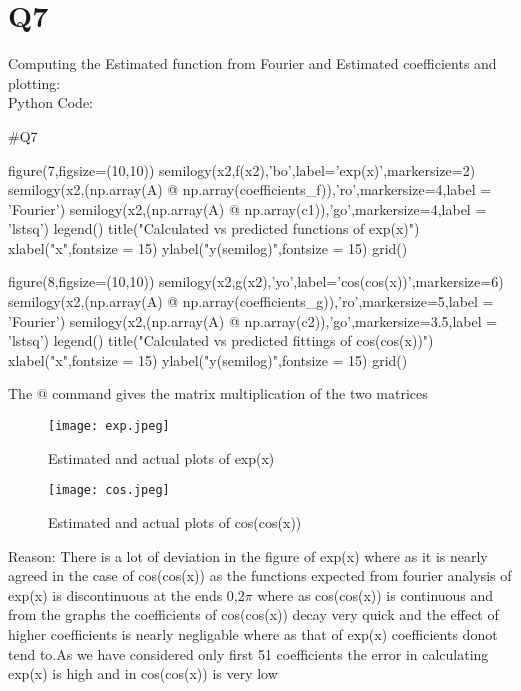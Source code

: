 \documentclass[12pt, a4paper]{report}
\begin{document}
\section*{Q7}
Computing the Estimated function from Fourier and Estimated coefficients and plotting: \\
Python Code:
\begin{py_code}
#Q7

figure(7,figsize=(10,10))
semilogy(x2,f(x2),'bo',label='exp(x)',markersize=2)
semilogy(x2,(np.array(A) @ np.array(coefficients_f)),'ro',markersize=4,label = 'Fourier')
semilogy(x2,(np.array(A) @ np.array(c1)),'go',markersize=4,label = 'lstsq')
legend()
title("Calculated vs predicted functions of exp(x)")
xlabel("x",fontsize = 15)
ylabel("y(semilog)",fontsize = 15)
grid()

figure(8,figsize=(10,10))
semilogy(x2,g(x2),'yo',label='cos(cos(x))',markersize=6)
semilogy(x2,(np.array(A) @ np.array(coefficients_g)),'ro',markersize=5,label = 'Fourier')
semilogy(x2,(np.array(A) @ np.array(c2)),'go',markersize=3.5,label = 'lstsq')
legend()
title("Calculated vs predicted fittings of cos(cos(x))")
xlabel("x",fontsize = 15)
ylabel("y(semilog)",fontsize = 15)
grid()
\end{py_code}
The @ command gives the matrix multiplication of the two matrices\\
 \begin{figure}[H]
	\centering
	\texttt{[image: exp.jpeg]}  %
	\caption{Estimated and actual plots of exp(x)}
	\label{fig:contour}
\end{figure} 
 \begin{figure}[H]
	\centering
	\texttt{[image: cos.jpeg]}  %
	\caption{Estimated and actual plots of cos(cos(x))}
	\label{fig:contour}
\end{figure} 
Reason:
There is a lot of deviation in the figure of exp(x) where as it is nearly agreed  in the case of cos(cos(x)) as the functions expected from fourier analysis of exp(x) is discontinuous at the ends 0,2$\pi$ where as cos(cos(x)) is continuous and from the graphs the coefficients of cos(cos(x)) decay very quick and the effect of higher coefficients is nearly negligable where as that of exp(x) coefficients donot tend to.As we have considered only first 51 coefficients the error in calculating exp(x) is high and in cos(cos(x)) is very low\\
\end{document}
